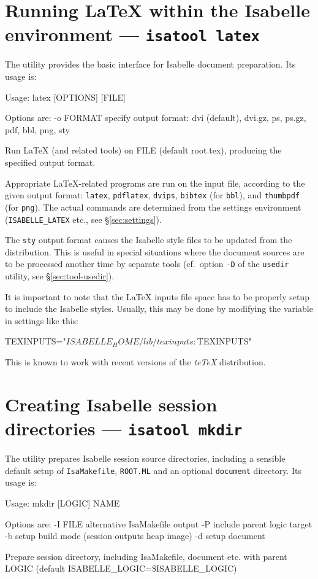 \section{Running {\LaTeX} within the Isabelle environment --- \texttt{isatool latex}}
\label{sec:tool-latex}

The  utility provides the basic interface for Isabelle document
preparation.  Its usage is:
\begin{ttbox}
Usage: latex [OPTIONS] [FILE]

  Options are:
    -o FORMAT    specify output format: dvi (default), dvi.gz, ps,
                 ps.gz, pdf, bbl, png, sty

  Run LaTeX (and related tools) on FILE (default root.tex),
  producing the specified output format.
\end{ttbox}
Appropriate {\LaTeX}-related programs are run on the input file, according to
the given output format: \texttt{latex}, \texttt{pdflatex}, \texttt{dvips},
\texttt{bibtex} (for \texttt{bbl}), and \texttt{thumbpdf} (for \texttt{png}).
The actual commands are determined from the settings environment
(\texttt{ISABELLE_LATEX} etc., see \S\ref{sec:settings}).

The \texttt{sty} output format causes the Isabelle style files to be updated
from the distribution.  This is useful in special situations where the
document sources are to be processed another time by separate tools (cf.\ 
option \texttt{-D} of the \texttt{usedir} utility, see
\S\ref{sec:tool-usedir}).

It is important to note that the {\LaTeX} inputs file space has to be properly
setup to include the Isabelle styles.  Usually, this may be done by modifying
the \settdx{TEXINPUTS} variable in settings like this:
\begin{ttbox}
TEXINPUTS="$ISABELLE_HOME/lib/texinputs:$TEXINPUTS"
\end{ttbox}
This is known to work with recent versions of the \textsl{teTeX} distribution.


\section{Creating Isabelle session directories --- \texttt{isatool mkdir}}
\label{sec:tool-mkdir}

The  utility prepares Isabelle session source directories,
including a sensible default setup of \texttt{IsaMakefile}, \texttt{ROOT.ML}
and an optional \texttt{document} directory.  Its usage is:
\begin{ttbox}
Usage: mkdir [LOGIC] NAME

  Options are:
    -I FILE      alternative IsaMakefile output
    -P           include parent logic target
    -b           setup build mode (session outputs heap image)
    -d           setup document

  Prepare session directory, including IsaMakefile, document etc.
  with parent LOGIC (default ISABELLE_LOGIC=\$ISABELLE_LOGIC)
\end{ttbox}


